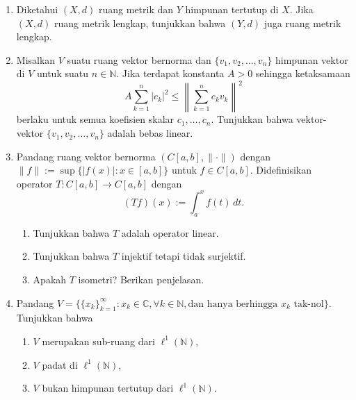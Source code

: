 \documentclass[11pt,letterpaper]{article}
\begin{document}
\begin{enumerate}
  \item Diketahui $(X,d)$ ruang metrik dan $Y$ himpunan tertutup di $X$. Jika $(X,d)$ ruang metrik lengkap, tunjukkan bahwa $(Y,d)$ juga ruang metrik lengkap.
        \bigskip
  \item Misalkan $V$ suatu ruang vektor bernorma dan $\{v_1, v_2, \dots, v_n\}$ himpunan vektor di $V$ untuk suatu $n \in \mathbb{N}$. Jika terdapat konstanta $A > 0$ sehingga ketaksamaan
        \[
          A \sum_{k=1}^{n} |c_k|^2 \leq \left\| \sum_{k=1}^{n} c_k v_k \right\|^2
        \]
        berlaku untuk semua koefisien skalar $c_1, \dots, c_n$. Tunjukkan bahwa vektor-vektor $\{v_1, v_2, \dots, v_n\}$ adalah bebas linear.
        \bigskip
  \item Pandang ruang vektor bernorma $(C[a,b], \|\cdot\|)$ dengan
        $
          \|f\| := \sup\{|f(x)| : x \in [a,b]\}
        $ untuk $f \in C[a,b]$.
        Didefinisikan operator $T: C[a,b] \to C[a,b]$ dengan
        \[
          (Tf)(x) := \int_a^x f(t) \, dt.
        \]
        \begin{enumerate}
          \item Tunjukkan bahwa $T$ adalah operator linear.
          \item Tunjukkan bahwa $T$ injektif tetapi tidak surjektif.
          \item Apakah $T$ isometri? Berikan penjelasan.
        \end{enumerate}
        \bigskip
  \item Pandang $V = \{ \{x_k\}_{k=1}^{\infty} : x_k \in \mathbb{C}, \forall k \in \mathbb{N}, \text{dan hanya berhingga } x_k \text{ tak-nol} \}$. Tunjukkan bahwa
        \begin{enumerate}
          \item $V$ merupakan sub-ruang dari $\ell^1(\mathbb{N})$,
          \item $V$ padat di $\ell^1(\mathbb{N})$,
          \item $V$ bukan himpunan tertutup dari $\ell^1(\mathbb{N})$.
        \end{enumerate}
\end{enumerate}
\end{document}
